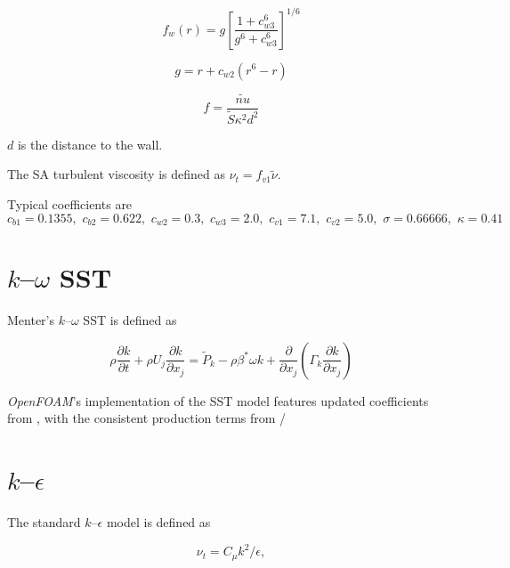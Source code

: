 \begin{equation}
    f_w(r) = g \left[ \frac{1 + c_{w3}^6}{g^6 + c_{w3}^6} \right]^{1/6}
\end{equation}

\begin{equation}
    g = r + c_{w2} (r^6 - r)
\end{equation}

\begin{equation}
    f = \frac{\tilde{nu}}{\tilde{S} \kappa^2 d^2}
\end{equation}

$d$ is the distance to the wall.

The SA turbulent viscosity is defined as $\nu_t = f_{v1} \tilde{\nu}$.

Typical coefficients are
\begin{equation}
    c_{b1} = 0.1355, \, \,
    c_{b2} = 0.622, \, \,
    c_{w2} = 0.3, \, \,
    c_{w3} = 2.0, \, \,
    c_{v1} = 7.1, \, \,
    c_{v2} = 5.0, \, \,
    \sigma = 0.66666, \, \,
    \kappa = 0.41
\end{equation}


\section{$k$--$\omega$ SST}

Menter's $k$--$\omega$ SST is defined as \cite{Menter2001}

\begin{equation}
    \rho \frac{\partial k}{\partial t}
    + \rho U_j \frac{\partial k}{\partial x_j}
    = \tilde{P}_k - \rho \beta^* \omega k
    + \frac{\partial}{\partial x_j}
    \left(
    \Gamma_k \frac{\partial k}{\partial x_j}
    \right)
    \label{eq:komegasst-k}
\end{equation}

\textit{OpenFOAM}'s implementation of the SST model features updated
coefficients from \cite{Menter2003}, with the consistent production terms from
\cite{Menter2001}/


\section{$k$--$\epsilon$}

The standard $k$--$\epsilon$ model is defined as \cite{Wilcox1994}

\begin{equation}
    \nu_t = C_\mu k^2 / \epsilon,
    \label{eq:kepsilon-nut}
\end{equation}

